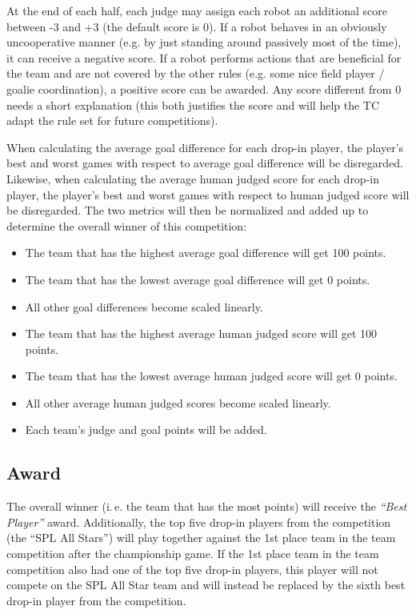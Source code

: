 \documentclass[12pt]{article}
\newcommand{\ie}{\mbox{i.\,e.}\xspace}
\begin{document}
At the end of each half, each judge may assign each robot an additional score between -3 and +3 (the default score is 0). If a robot behaves in an obviously uncooperative manner (e.g. by just standing around passively most of the time), it can receive a negative score. If a robot performs actions that are beneficial for the team and are not covered by the other rules (e.g. some nice field player / goalie coordination), a positive score can be awarded.  Any score different from 0 needs a short explanation (this both justifies the score and will help the TC adapt the rule set for future competitions).

When calculating the average goal difference for each drop-in player, the player's best and worst games with respect to average goal difference will be disregarded.  Likewise, when calculating the average human judged score for each drop-in player, the player's best and worst games with respect to human judged score will be disregarded.  The two metrics will then be normalized and added up to determine the overall winner of this competition:
\begin{itemize}
\item The team that has the highest average goal difference will get 100 points.
\item The team that has the lowest average goal difference will get 0 points.
\item All other goal differences become scaled linearly. 
\item The team that has the highest average human judged score will get 100 points.
\item The team that has the lowest average human judged score will get 0 points.
\item All other average human judged scores become scaled linearly. 
\item Each team's judge and goal points will be added.
\end{itemize}


\subsection{Award}
The overall winner (\ie the team that has the most points) will
receive the \textit{``Best Player''} award.  Additionally, the top
five drop-in players from the competition (the ``SPL All Stars'') will play together against the 1st place team in the team competition after the championship game.  If the 1st place team in the team competition also had one of the top five drop-in players, this player will not compete on the SPL All Star team and will instead be replaced by the sixth best drop-in player from the competition.
\end{document}
